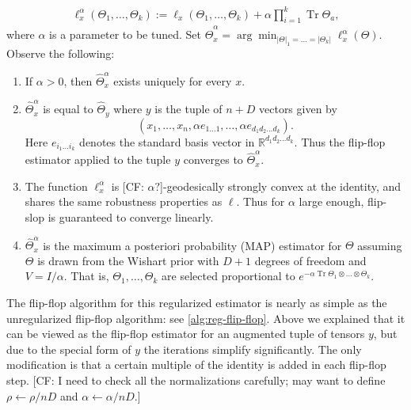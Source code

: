 \documentclass[aos]{imsart}
\theoremstyle{definition}
\numberwithin{equation}{section}
\DeclareMathOperator{\tr}{Tr}
\newcommand{\R}{{\mathbb{R}}}
\newcommand{\ot}{\otimes}
\newcommand{\samp}{x}
\newcommand{\CF}[1]{{\color{purple}[CF: #1]}}
\begin{document}
\begin{align*}
  \ell_{\samp}^\alpha(\Theta_1, \dots, \Theta_k)
  := \ell_{\samp}(\Theta_1, \dots, \Theta_k) + \alpha \prod_{i=1}^k \tr \Theta_a,
\end{align*}
where $\alpha$ is a parameter to be tuned. Set $\widehat{\Theta}^\alpha_x = \arg\min_{|\Theta|_1 =\dots =  |\Theta_k|} \ell^\alpha_\samp(\Theta)$.
Observe the following:
\begin{enumerate}
\item If $\alpha > 0$, then $\widehat{\Theta}^\alpha_x$ exists uniquely for every $x$.
\item $\widehat{\Theta}^\alpha_x$ is equal to $\widehat{\Theta}_{y}$ where $y$ is the tuple of $n + D$ vectors given by
$$(x_1, \dots, x_n, \alpha e_{1\dots 1}, \dots, \alpha e_{d_1d_2 \dots d_k}).$$ Here $e_{i_1 \dots i_k}$ denotes the standard basis vector in $\R^{d_1d_2 \dots d_k}$. Thus the flip-flop estimator applied to the tuple $y$ converges to $\widehat{\Theta}^\alpha_x$.
\item The function $\ell^\alpha_\samp$ is \CF{$\alpha?$}-geodesically strongly convex at the identity, and shares the same robustness properties as $\ell$. Thus for $\alpha$ large enough, flip-slop is guaranteed to converge linearly.
\item $\widehat{\Theta}^\alpha_\samp$ is the maximum a posteriori probability (MAP) estimator for $\Theta$ assuming $\Theta$ is drawn from the Wishart prior with $D + 1$ degrees of freedom and $V = I/\alpha$. That is, $\Theta_1, \dots, \Theta_k$ are selected proportional to $e^{- \alpha \tr \Theta_1 \ot \dots \ot \Theta_k}.$ 
\end{enumerate}


The flip-flop algorithm for this regularized estimator is nearly as simple as the unregularized flip-flop algorithm: see \cref{alg:reg-flip-flop}. Above we explained that it can be viewed as the flip-flop estimator for an augmented tuple of tensors $y$, but due to the special form of $y$ the iterations simplify significantly. The only modification is that a certain multiple of the identity is added in each flip-flop step.  \CF{I need to check all the normalizations carefully; may want to define $\rho \leftarrow \rho/nD$ and $\alpha \leftarrow \alpha/nD$.} 
\end{document}
